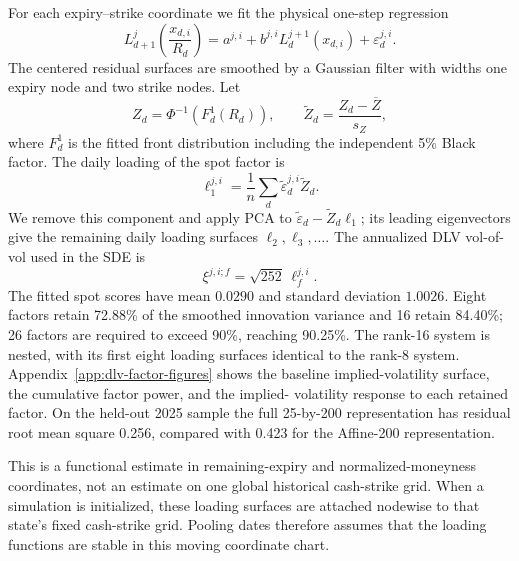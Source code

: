 \documentclass[11pt]{article}
\theoremstyle{plain}
\theoremstyle{definition}
\theoremstyle{remark}
\begin{document}
For each expiry--strike coordinate we fit the physical one-step regression
\begin{equation}
  \label{eq:estimation-dlv-ar}
  L_{d+1}^{j}\!\left(\frac{x_{d,i}}{R_d}\right)
  =a^{j,i}+b^{j,i}L_d^{j+1}(x_{d,i})+\varepsilon_d^{j,i}.
\end{equation}
The centered residual surfaces are smoothed by a Gaussian filter with widths
one expiry node and two strike nodes.  Let
\[
  Z_d=\Phi^{-1}\!\left(F_d^1(R_d)\right),
  \qquad
  \widetilde Z_d=\frac{Z_d-\overline Z}{s_Z},
\]
where $F_d^1$ is the fitted front distribution including the independent 5\%
Black factor.  The daily loading of the spot factor is
\[
  \ell_1^{j,i}=\frac1n\sum_d
    \widetilde\varepsilon_d^{j,i}\widetilde Z_d.
\]
We remove this component and apply PCA to
$\widetilde\varepsilon_d-\widetilde Z_d\ell_1$; its leading eigenvectors give
the remaining daily loading surfaces $\ell_2,\ell_3,\ldots$.  The annualized
DLV vol-of-vol used in the SDE is
\begin{equation}
  \label{eq:estimation-annualized-xi}
  \xi^{j,i;f}=\sqrt{252}\,\ell_f^{j,i}.
\end{equation}
The fitted spot scores have mean $0.0290$ and standard deviation $1.0026$.
Eight factors retain 72.88\% of the smoothed innovation variance and 16 retain
84.40\%; 26 factors are required to exceed 90\%, reaching 90.25\%.  The
rank-16 system is nested, with its first eight loading surfaces identical to
the rank-8 system.  Appendix~\ref{app:dlv-factor-figures} shows the baseline
implied-volatility surface, the cumulative factor power, and the implied-
volatility response to each retained factor.  On the held-out 2025 sample the
full 25-by-200 representation has residual root mean square 0.256, compared
with 0.423 for the Affine-200 representation.

This is a functional estimate in remaining-expiry and normalized-moneyness
coordinates, not an estimate on one global historical cash-strike grid.  When
a simulation is initialized, these loading surfaces are attached nodewise to
that state's fixed cash-strike grid.  Pooling dates therefore assumes that the
loading functions are stable in this moving coordinate chart.
\end{document}
